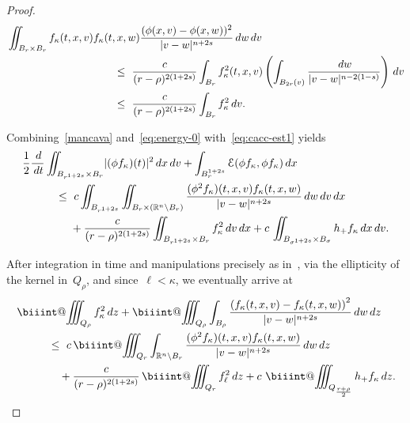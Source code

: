 \documentclass[leqno,10pt]{amsart}
\makeatletter
\theoremstyle{plain}
\theoremstyle{remark}
\numberwithin{equation}{section}
\def\dz{\,{\rm d}z}
\def\dx{\,{\rm d}x}
\def\dv{\,{\rm d}v}
\def\dw{\,{\rm d}w}
\def\dt{\,{\rm d}t}
\def \d{\,{\rm d}}
\def\ern{\mathbb{R}^n}
\newcommand{\Ec}{\mathcal{E}}
\newcommand{\snr}[1]{\lvert #1\rvert}
\newcommand{\kk}{\kappa}
\def\biiint{%
  \mathop{\mathpalette\biiint@{}}\nolimits\!\iiint}
\def\biiint@#1#2{%
  \begingroup
  \setbox0=\hbox{$\m@th#1\iiint$}%
  \dimen@=.81\wd0 %
  \rlap{\hbox to\wd0{%
    \vphantom{\copy0}%
    \hfil$\m@th#1\vcenter{%
      \hrule width\dimen@ height.30pt
    }$\hfil
  }}%
  \endgroup}
\makeatother
\begin{document}
{\begin{proof}
	\begin{equation}\label{eq:singular-int}
	\begin{aligned}
        & \iint_{B_r \times B_r}f_\kk(t,x,v)f_\kk(t,x,w)\frac{(\phi(x,v)-\phi(x,w))^2}{\snr{v-w}^{n+2s}} \dw\dv \\*
		&\qquad \qquad \qquad \qquad\qquad \leq \  \frac{c}{({r}-{\rho})^{2(1+2s)}}\int_{B_{{r}}}f_\kk^2(t,x,v) \left(\int_{B_{2{r}}(v)}\frac{\dw}{|v-w|^{n-2(1-s)}}\right)\dv\\*
		&\qquad \qquad \qquad \qquad\qquad\leq \ \frac{c}{({r}-{\rho})^{2(1+2s)}}\int_{B_{{r}}}f_\kk^2 \dv.
    \end{aligned}
	\end{equation}
	
	Combining~\eqref{mancava} and~\eqref{eq:energy-0} with~\eqref{eq:cacc-est1} yields
    \[
    \begin{aligned}
   & \frac{1}{2}\frac{\d}{\dt} \iint_{B_{r^{1+2s}}\times B_r} \snr{(\phi f_\kk)(t)}^2\dx\dv + \int_{B_r^{1+2s}} \Ec(\phi f_\kk,\phi f_\kk) \dx \\*
   &  \qquad\quad \leq \ c\iint_{B_{r^{1+2s}}}\iint_{B_r \times (\ern \setminus B_r)} \frac{(\phi^2f_\kk)(t,x,v)f_\kk(t,x,w)}{\snr{v-w}^{n+2s}} \dw\dv\dx \\*
	&\qquad\qquad \ + \frac{c}{({r}-{\rho})^{2(1+2s)}}\iint_{B_{r^{1+2s}}\times B_r} f_\kk^2\dv\dx  + c\,\iint_{B_{\sigma^{1+2s}}\times B_{\sigma}} h_+ f_\kk\dx\dv.\notag
    \end{aligned}
	\]
	
	After integration in time and manipulations precisely as in~\cite[Lemma 2.2]{Sto19}, via the ellipticity of the kernel in~$Q_\rho$, and since~$\ell<\kk$, we eventually arrive at
	\begin{equation}\label{eq:cacc-final-1}
    \begin{aligned}
	& \biiint_{Q_\rho} f_\kk^2\dz   +\biiint_{Q_\rho}\int_{B_\rho}        \frac{\left(f_\kk(t,x,v)-f_\kk(t,x,w)\right)^2}{|v-w|^{n+2s}}\dw\dz\\*
	& \qquad\quad  \leq  \ 
		 c\biiint_{Q_r}\int_{\ern \setminus B_r} \frac{(\phi^2f_\kk)(t,x,v)f_\kk(t,x,w)}{\snr{v-w}^{n+2s}} \dw\d z \\*
	& \qquad\qquad + \frac{c}{({r}-{\rho})^{2(1+2s)}}\biiint_{Q_r}f_\ell^2\dz+ c\,\biiint_{Q_{\frac{r + \rho}{2}}} h_+ f_\kk\dz.
    \end{aligned}
	\end{equation}
	

\end{proof}}
\end{document}
